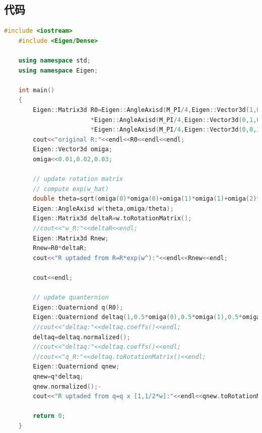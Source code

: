 \documentclass[UTF8]{ctexart}
\begin{document}
\subsection{代码}
\begin{lstlisting}[language={c++}]
    #include <iostream>
    #include <Eigen/Dense>
    
    using namespace std;
    using namespace Eigen;
    
    int main()
    {
        Eigen::Matrix3d R0=Eigen::AngleAxisd(M_PI/4,Eigen::Vector3d(1,0,0)).toRotationMatrix()
                        *Eigen::AngleAxisd(M_PI/4,Eigen::Vector3d(0,1,0)).toRotationMatrix()
                        *Eigen::AngleAxisd(M_PI/4,Eigen::Vector3d(0,0,1)).toRotationMatrix();
        cout<<"original R:"<<endl<<R0<<endl<<endl;
        Eigen::Vector3d omiga;
        omiga<<0.01,0.02,0.03;
    
        // update rotation matrix
        // compute exp(w_hat)
        double theta=sqrt(omiga(0)*omiga(0)+omiga(1)*omiga(1)+omiga(2)*omiga(2));
        Eigen::AngleAxisd w(theta,omiga/theta);
        Eigen::Matrix3d deltaR=w.toRotationMatrix();
        //cout<<"w_R:"<<deltaR<<endl;
        Eigen::Matrix3d Rnew;
        Rnew=R0*deltaR;
        cout<<"R uptaded from R=R*exp(w^):"<<endl<<Rnew<<endl;
    
        cout<<endl;
    
        // update quanternion
        Eigen::Quaterniond q(R0);
        Eigen::Quaterniond deltaq(1,0.5*omiga(0),0.5*omiga(1),0.5*omiga(2));
        //cout<<"deltaq:"<<deltaq.coeffs()<<endl;
        deltaq=deltaq.normalized();
        //cout<<"deltaq:"<<deltaq.coeffs()<<endl;
        //cout<<"q_R:"<<deltaq.toRotationMatrix()<<endl;
        Eigen::Quaterniond qnew;
        qnew=q*deltaq;
        qnew.normalized();-
        cout<<"R uptaded from q=q x [1,1/2*w]:"<<endl<<qnew.toRotationMatrix()<<endl;
        
        return 0;
    }
    
\end{lstlisting}
\end{document}
